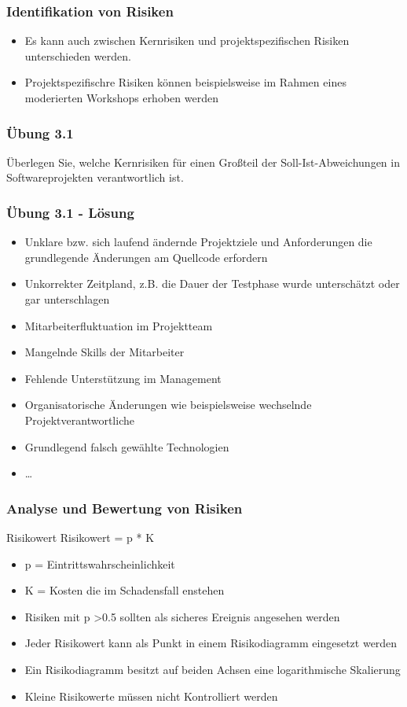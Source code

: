 \begin{frame}
\frametitle{Identifikation von Risiken}
	\begin{itemize}
		\item Es kann auch zwischen Kernrisiken und projektspezifischen Risiken unterschieden werden.
		\item Projektspezifischre Risiken können beispielsweise im Rahmen eines moderierten
		Workshops erhoben werden
	\end{itemize}
\end{frame}

\begin{frame}
\frametitle{Übung 3.1}
	Überlegen Sie, welche Kernrisiken für einen Großteil der Soll-Ist-Abweichungen
	in Softwareprojekten verantwortlich ist.
\end{frame}

\ifloesung
\begin{frame}
\frametitle{Übung 3.1 - Lösung}
	\begin{itemize}
		\item Unklare bzw. sich laufend ändernde Projektziele und Anforderungen
					die grundlegende Änderungen am Quellcode erfordern
		\item Unkorrekter Zeitpland, z.B. die
					Dauer der Testphase wurde unterschätzt oder gar unterschlagen
		\item Mitarbeiterfluktuation im Projektteam
		\item Mangelnde Skills der Mitarbeiter
		\item Fehlende Unterstützung im Management
		\item Organisatorische Änderungen wie beispielsweise wechselnde Projektverantwortliche
		\item Grundlegend falsch gewählte Technologien
		\item \ldots
	\end{itemize}
\end{frame}
\fi

\begin{frame}
\frametitle{Analyse und Bewertung von Risiken}
	\begin{block}{Risikowert}
		Risikowert = p * K
		\begin{itemize}
			\item p = Eintrittswahrscheinlichkeit
			\item K = Kosten die im Schadensfall enstehen
		\end{itemize}
	\end{block}
	\begin{itemize}
		\item Risiken mit p \textgreater 0.5 sollten als sicheres Ereignis angesehen werden
		\item Jeder Risikowert kann als Punkt in einem Risikodiagramm eingesetzt werden
		\item Ein Risikodiagramm besitzt auf beiden Achsen eine logarithmische Skalierung
		\item Kleine Risikowerte müssen nicht Kontrolliert werden
	\end{itemize}
\end{frame}

